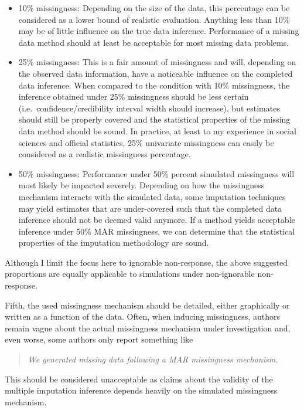 \documentclass[
]{article}
\providecommand{\tightlist}{%
  \setlength{\itemsep}{0pt}\setlength{\parskip}{0pt}}
\begin{document}
\begin{itemize}
\tightlist
\item
  10\% missingness: Depending on the size of the data, this percentage
  can be considered as a lower bound of realistic evaluation. Anything
  less than 10\% may be of little influence on the true data inference.
  Performance of a missing data method should at least be acceptable for
  most missing data problems.
\item
  25\% missingness: This is a fair amount of missingness and will,
  depending on the observed data information, have a noticeable
  influence on the completed data inference. When compared to the
  condition with 10\% missingness, the inference obtained under 25\%
  missingness should be less certain (i.e.~confidence/credibility
  interval width should increase), but estimates should still be
  properly covered and the statistical properties of the missing data
  method should be sound. In practice, at least to my experience in
  social sciences and official statistics, 25\% univariate missingness
  can easily be considered as a realistic missingness percentage.
\item
  50\% missingness: Performance under 50\% percent simulated missingness
  will most likely be impacted severely. Depending on how the
  missingness mechanism interacts with the simulated data, some
  imputation techniques may yield estimates that are under-covered such
  that the completed data inference should not be deemed valid anymore.
  If a method yields acceptable inference under 50\% MAR missingness, we
  can determine that the statistical properties of the imputation
  methodology are sound.
\end{itemize}

Although I limit the focus here to ignorable non-response, the above
suggested proportions are equally applicable to simulations under
non-ignorable non-response.

Fifth, the used missingness mechanism should be detailed, either
graphically or written as a function of the data. Often, when inducing
missingness, authors remain vague about the actual missingness mechanism
under investigation and, even worse, some authors only report something
like

\begin{quote}
\emph{We generated missing data following a MAR missingness mechanism.}
\end{quote}

This should be considered unacceptable as claims about the validity of
the multiple imputation inference depends heavily on the simulated
missingness mechanism.
\end{document}
